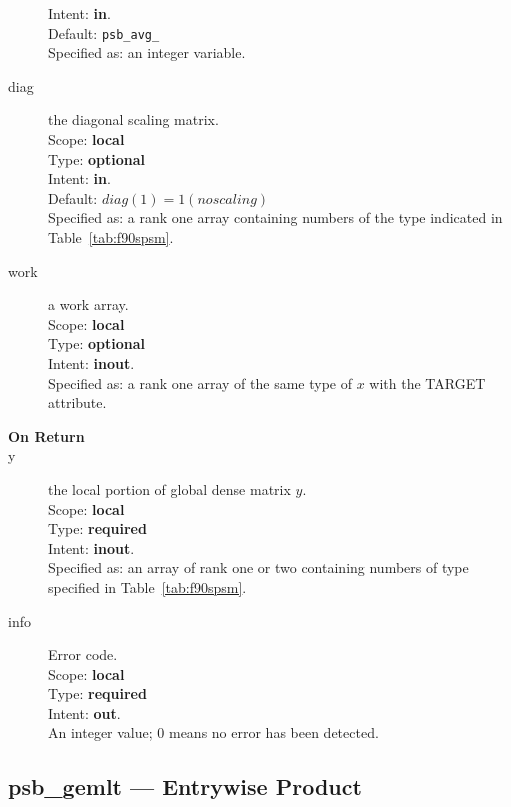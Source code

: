 \begin{description}
Intent: {\bf in}.\\
Default: \verb|psb_avg_|\\	
Specified as: an integer variable.
\item[diag] the diagonal scaling matrix.\\
Scope: {\bf local} \\
Type: {\bf optional}\\	
Intent: {\bf in}.\\
Default: $diag(1) = 1 (no scaling)$\\	
Specified as: a rank one  array containing numbers of the type
indicated in Table~\ref{tab:f90spsm}.
\item[work] a work array. \\
Scope: {\bf local} \\
Type: {\bf optional}\\	
Intent: {\bf inout}.\\
Specified as: a rank one array of the same type of $x$ with the
TARGET attribute. 

\item[\bf On Return] 
\item[y] the local portion of global dense matrix
$y$. %
\\
Scope: {\bf local} \\
Type: {\bf required} \\
Intent: {\bf inout}.\\
Specified as: an array of rank one or two
containing numbers of type specified in
Table~\ref{tab:f90spsm}.
\item[info] Error code.\\
Scope: {\bf local} \\
Type: {\bf required} \\
Intent: {\bf out}.\\
An integer value; 0 means no error has been detected. 
\end{description}

%
%


\clearpage\subsection*{psb\_gemlt --- Entrywise Product}

